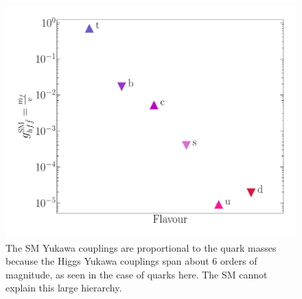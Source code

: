 \begin{figure}[htpb!]
	\centering
	\includegraphics[width=0.5\linewidth]{./figures/yukawa}
	\caption{The SM Yukawa couplings are proportional to the quark masses because the Higgs Yukawa couplings span about $6$ orders of magnitude, as seen in the case of quarks here. The SM cannot explain this large hierarchy. } 
	\label{fig:SMYuk}
\end{figure}
